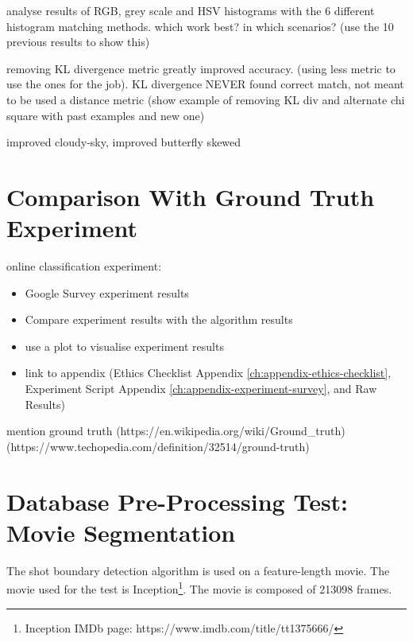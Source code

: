 analyse results of RGB, grey scale and HSV histograms with the 6 different histogram matching methods. which work best? in which scenarios? (use the 10 previous results to show this)

removing KL divergence metric greatly improved accuracy. (using less metric to use the ones for the job). KL divergence NEVER found correct match, not meant to be used a distance metric (show example of removing KL div and alternate chi square with past examples and new one)

improved cloudy-sky,
improved butterfly skewed


\section{Comparison With Ground Truth Experiment}

online classification experiment:
    \begin{itemize}
        \item Google Survey experiment results 
        \item Compare experiment results with the algorithm results
        \item use a plot to visualise experiment results
        \item link to appendix (Ethics Checklist Appendix \ref{ch:appendix-ethics-checklist}, Experiment Script Appendix \ref{ch:appendix-experiment-survey}, and Raw Results)
    \end{itemize}
    
mention ground truth (https://en.wikipedia.org/wiki/Ground\_truth) (https://www.techopedia.com/definition/32514/ground-truth)


\section{Database Pre-Processing Test: Movie Segmentation}

The shot boundary detection algorithm is used on a feature-length movie. The movie used for the test is Inception\footnote{Inception IMDb page: https://www.imdb.com/title/tt1375666/}. The movie is composed of 213098 frames.

